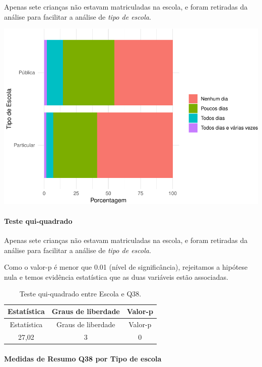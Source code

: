 \documentclass[]{article}
\let\oldparagraph\paragraph
\renewcommand{\paragraph}[1]{\oldparagraph{#1}\mbox{}}
\begin{document}
Apenas sete crianças não estavam matriculadas na escola, e foram retiradas da análise para facilitar a análise de \emph{tipo de escola}.

\begin{center}\includegraphics[width=0.75\linewidth]{relatorio_covid19_files/figure-latex/unnamed-chunk-1469-1} \end{center}

\hypertarget{teste-qui-quadrado-126}{%
\paragraph{Teste qui-quadrado}\label{teste-qui-quadrado-126}}

Apenas sete crianças não estavam matriculadas na escola, e foram retiradas da análise para facilitar a análise de \emph{tipo de escola}.

Como o valor-p é menor que 0.01 (nível de significância), rejeitamos a hipótese nula e temos evidência estatística que as duas variáveis estão associadas.

\begin{longtable}[]{@{}ccc@{}}
\caption{\label{tab:unnamed-chunk-1471}Teste qui-quadrado entre Escola e Q38.}\tabularnewline
\toprule
Estatística & Graus de liberdade & Valor-p\tabularnewline
\midrule
\endfirsthead
\toprule
Estatística & Graus de liberdade & Valor-p\tabularnewline
\midrule
\endhead
27,02 & 3 & 0\tabularnewline
\bottomrule
\end{longtable}

\cleardoublepage

\hypertarget{medidas-de-resumo-q38-por-tipo-de-escola}{%
\paragraph{Medidas de Resumo Q38 por Tipo de escola}\label{medidas-de-resumo-q38-por-tipo-de-escola}}
\end{document}
